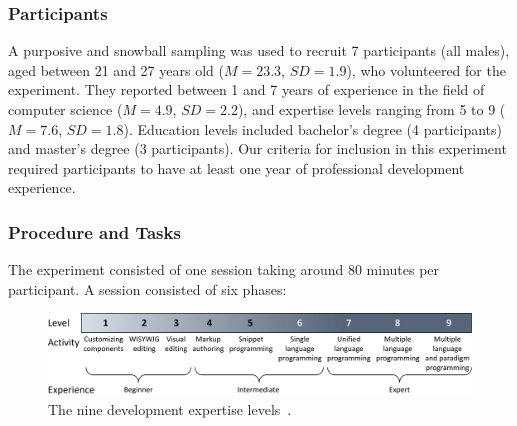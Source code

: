 \subsubsection{Participants}
A purposive and snowball sampling was used to recruit 7 participants (all males), aged between 21 and 27 years old ($M{=}23.3$, $SD{=}1.9$), who volunteered for the experiment. They reported between 1 and 7 years of experience in the field of computer science ($M{=}4.9$, $SD{=}2.2$), and expertise levels ranging from 5 to 9 ($M{=}7.6$, $SD{=}1.8$). Education levels included bachelor's degree (4 participants) and master's degree (3 participants). Our criteria for inclusion in this experiment required participants to have at least one year of professional development experience.

\subsubsection{Procedure and Tasks}
The experiment consisted of one session taking around 80 minutes per participant. A session consisted of six phases:

\begin{figure}[tb]
    \centering
    \includegraphics[width=\linewidth]{Figures/QuantumLeap/Evaluation/expertise-levels.pdf}
    \vspace{-8pt}
    \caption{The nine development expertise levels~\cite{Costabile:2008}.} %
    \vspace{-8pt}
    \label{fig:quantumleap:expertise}
\end{figure}

